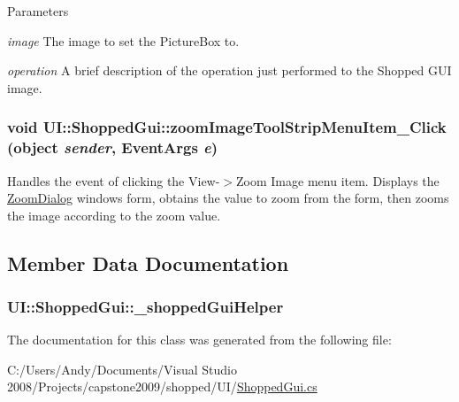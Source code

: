 \begin{DoxyParams}{Parameters}
\item[{\em image}]The image to set the PictureBox to. \item[{\em operation}]A brief description of the operation just performed to the Shopped GUI image. \end{DoxyParams}
\hypertarget{class_u_i_1_1_shopped_gui_a5f99b03c74d01734153873d6c35fbdf3}{
\subsubsection[{zoomImageToolStripMenuItem\_\-Click}]{\setlength{\rightskip}{0pt plus 5cm}void UI::ShoppedGui::zoomImageToolStripMenuItem\_\-Click (object {\em sender}, \/  EventArgs {\em e})}}
\label{class_u_i_1_1_shopped_gui_a5f99b03c74d01734153873d6c35fbdf3}
Handles the event of clicking the View-\/$>$Zoom Image menu item. Displays the \hyperlink{class_u_i_1_1_zoom_dialog}{ZoomDialog} windows form, obtains the value to zoom from the form, then zooms the image according to the zoom value. 

\subsection{Member Data Documentation}
\hypertarget{class_u_i_1_1_shopped_gui_a19139212d3779912c914ee07e2365cf6}{
\subsubsection[{\_\-shoppedGuiHelper}]{ {\bf UI::ShoppedGui::\_\-shoppedGuiHelper}}}
\label{class_u_i_1_1_shopped_gui_a19139212d3779912c914ee07e2365cf6}


The documentation for this class was generated from the following file:\begin{DoxyCompactItemize}
\item 
C:/Users/Andy/Documents/Visual Studio 2008/Projects/capstone2009/shopped/UI/\hyperlink{_shopped_gui_8cs}{ShoppedGui.cs}\end{DoxyCompactItemize}
